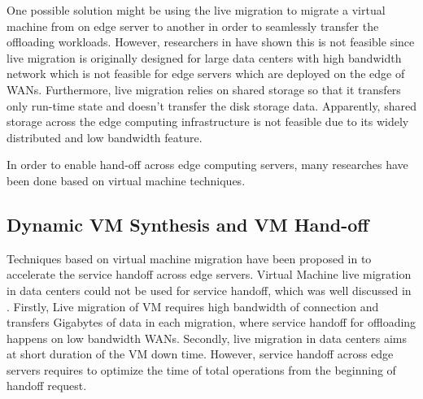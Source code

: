 One possible solution might be using the live migration to migrate a virtual machine from on edge server to another in order to seamlessly transfer the offloading workloads. However, researchers in \cite{ha2015vmhandoff} have shown this is not feasible since live migration is originally designed for large data centers with high bandwidth network which is not feasible for edge servers which are deployed on the edge of WANs. Furthermore, live migration relies on shared storage so that it transfers only run-time state and doesn't transfer the disk storage data. Apparently, shared storage across the edge computing infrastructure is not feasible due to its widely distributed and low bandwidth feature. 

In order to enable hand-off across edge computing servers, many researches have been done based on virtual machine techniques. 


\subsection{Dynamic VM Synthesis and VM Hand-off} \label{motivation:vmhandoff}

Techniques based on virtual machine migration have been proposed in  \cite{ha2015vmhandoff} \cite{satya2009case} to accelerate the service handoff across edge servers. Virtual Machine live migration in data centers could not be used for service handoff, which was well discussed in \cite{ha2015vmhandoff}. Firstly, Live migration of VM requires high bandwidth of connection and transfers Gigabytes of data in each migration, where service handoff for offloading happens on low bandwidth WANs. Secondly, live migration in data centers aims at short duration of the VM down time. However, service handoff across edge servers requires to optimize the time of total operations from the beginning of handoff request. 

